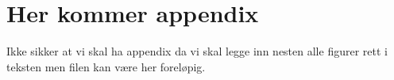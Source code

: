 \appendix

\chapter{Her kommer appendix}
Ikke sikker at vi skal ha appendix da vi skal legge inn nesten alle figurer rett i teksten men filen kan være her foreløpig.

